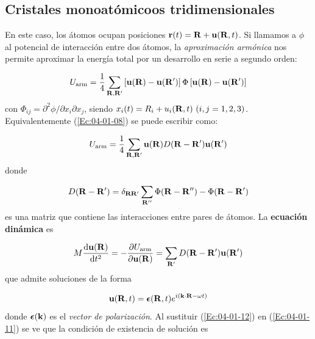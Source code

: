 \subsection{Cristales monoatómicoos tridimensionales}

En este caso, los átomos ocupan posiciones $\mathbf{r}(t) = \mathbf{R} + \mathbf{u} (\mathbf{R},t)$. Si llamamos a $\phi$ al potencial de interacción entre dos átomos, la \textit{aproximación armónica} nos permite aproximar la energía total por un desarrollo en serie a segundo orden:

\begin{equation}
	U_{\text{arm}} = \frac{1}{4} \sum_{\mathbf{R},\mathbf{R}'} \left[ \mathbf{u}(\mathbf{R})-\mathbf{u}(\mathbf{R}') \right] \Phi \left[ \mathbf{u}(\mathbf{R})-\mathbf{u}(\mathbf{R}') \right] \label{Ec:04-01-08}
\end{equation}
con $\Phi_{ij}=\partial^2 \phi / \partial x_i \partial x_j$, siendo $x_i(t) = R_i + u_i (\Rn,t) \ (i,j=1,2,3)$. Equivalentemente (\ref{Ec:04-01-08}) se puede escribir como:

\begin{equation}
	U_{\text{arm}} = \frac{1}{4} \sum_{\mathbf{R},\mathbf{R}'}\mathbf{u}(\mathbf{R}) D(\mathbf{R}-\mathbf{R}' ) \mathbf{u}(\mathbf{R}') \label{Ec:04-01-09}
\end{equation}
donde 

\begin{equation}
	 D(\mathbf{R}-\mathbf{R}' ) = \delta_{\mathbf{R} \mathbf{R}'} \sum_{\mathbf{R}''} \Phi (\mathbf{R}- \mathbf{R}'') - \Phi (\mathbf{R} - \mathbf{R}')
\end{equation}
es una matriz que contiene las interacciones entre pares de átomos. La {\bf ecuación dinámica} es

\begin{equation}
 	M \frac{\mathrm{d} \mathbf{u} (\mathbf{R})}{\mathrm{d} t^2} =  - \frac{\partial U_\text{arm}}{\partial \mathbf{u} (\mathbf{R})} = \sum_{\mathbf{R}'} D (\mathbf{R}-\mathbf{R}') \mathbf{u} (\mathbf{R}') \label{Ec:04-01-11}
\end{equation}
que admite soluciones de la forma

\begin{equation}
	\mathbf{u} (\mathbf{R},t) = \boldsymbol{\epsilon} (\mathbf{R},t) e^{i(\mathbf{k} \cdot \mathbf{R} - \omega t)}  \label{Ec:04-01-12}
\end{equation}
donde $\boldsymbol{\epsilon}(\mathbf{k})$ es el \textit{vector de polarización}. Al sustituir  (\ref{Ec:04-01-12}) en (\ref{Ec:04-01-11}) se ve que la condición de existencia de solución es 

